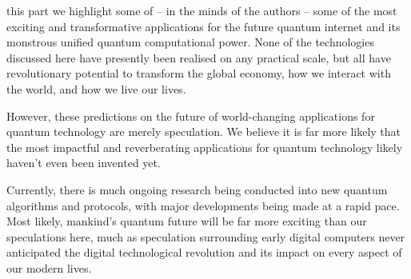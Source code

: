 %
%

 this part we highlight some of -- in the minds of the authors -- some of the most exciting and transformative applications for the future quantum internet and its monstrous unified quantum computational power. None of the technologies discussed here have presently been realised on any practical scale, but all have revolutionary potential to transform the global economy, how we interact with the world, and how we live our lives.

However, these predictions on the future of world-changing applications for quantum technology are merely speculation. We believe it is far more likely that the most impactful and reverberating applications for quantum technology likely haven't even been invented yet.

Currently, there is much ongoing research being conducted into new quantum algorithms and protocols, with major developments being made at a rapid pace. Most likely, mankind's quantum future will be far more exciting than our speculations here, much as speculation surrounding early digital computers never anticipated the digital technological revolution and its impact on every aspect of our modern lives.